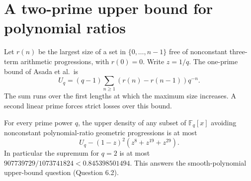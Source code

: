 \section{A two-prime upper bound for polynomial ratios}
\label{sec:triangle}
Let $r(n)$ be the largest size of a set in $\{0,\ldots,n-1\}$ free of nonconstant three-term arithmetic progressions, with $r(0)=0$. Write $z=1/q$. The one-prime bound of Asada et al.\ is
\[
 U_q=(q-1)\sum_{n\ge1}(r(n)-r(n-1))q^{-n}.
\]
The sum runs over the first lengths at which the maximum size increases. A second linear prime forces strict losses over this bound.

\begin{theorem}
For every prime power $q$, the upper density of any subset of $\mathbb F_q[x]$ avoiding nonconstant polynomial-ratio geometric progressions is at most
\[
 U_q-(1-z)^2(z^8+z^{19}+z^{29}).
\]
In particular the supremum for $q=2$ is at most $907739729/1073741824<0.845398501494$. This answers the smooth-polynomial upper-bound question (Question 6.2).
\end{theorem}

